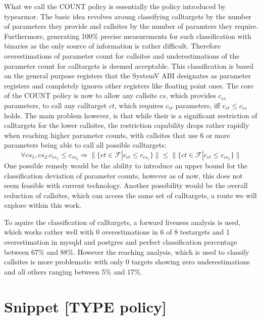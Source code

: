 What we call the COUNT policy is essentially the policy introduced by typearmor\cite{typearmor}. The basic idea revolves aroung classifying calltargets by the number of parameters they provide and callsites by the number of paramters they require. Furthermore, generating 100\% precise measurements for such classification with binaries as the only source of information is rather difficult. Therefore overestimations of parameter count for callsites and underestimations of the parameter count for calltargets is deemed acceptable. This classification is based on the general purpose registers that the SystemV ABI designates as parameter registers and completely ignores other registers like floating point ones. The core of the COUNT policy is now to allow any callsite $cs$, which provides $c_{cs}$ parameters, to call any calltarget $ct$, which requires $c_{ct}$ parameters, iff $c_{ct} \leq c_{cs}$ holds. The main problem however, is that while their is a significant restriction of calltargets for the lower callsites, the restriction capability drops rather rapidly when reaching higher parameter counts, with callsites that use 6 or more parameters being able to call all possible calltargets:
\[
	\forall cs_1, cs_2.  c_{cs_1} \leq c_{cs_2} \Longrightarrow  \| \{ct \in \mathcal{F} | c_{ct} \leq c_{cs_1} \} \| \leq \| \{ct \in \mathcal{F} | c_{ct} \leq c_{cs_2}  \} \|
\]
One possible remedy would be the ability to introduce an upper bound for the classification deviation of parameter counts, however as of now, this does not seem feasible with current technology. Another possibility would be the overall reduction of callsites, which can access the same set of calltargets, a route we will explore within this work.

To aquire the classification of calltargets, a forward liveness analysis is used, which works rather well with 0 overestimations in 6 of 8 testargets and 1 overestimation in mysqld and postgres and perfect classification percentage between 67\% and 88\%. 
However the reaching analysis, which is used to classify callsites is more problematic with only 0 targets showing zero underestimations and all others ranging between 5\% and 17\%.


\chapter{Snippet [TYPE policy]}

